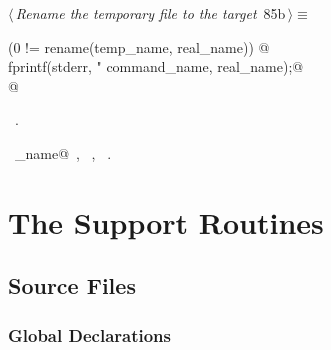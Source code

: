 \documentclass[a4paper]{report}
\begin{document}
\begin{flushleft} \small
\begin{minipage}{\linewidth}\label{scrap175}\raggedright\small
{} $\langle\,${\it Rename the temporary file to the target}\nobreak\ {\footnotesize {85b}}$\,\rangle\equiv$
\vspace{-1ex}
\begin{list}{}{} \item
\mbox{}\verb@if (0 != rename(temp_name, real_name)) {@\\
\mbox{}\verb@  fprintf(stderr, "%s: can't rename output file to %s\n",@\\
\mbox{}\verb@          command_name, real_name);@\\
\mbox{}\verb@}@\\
\mbox{}\verb@@{\NWsep}
\end{list}
\vspace{-1.5ex}
\footnotesize
\begin{list}{}{\setlength{\itemsep}{-\parsep}\setlength{\itemindent}{-\leftmargin}}
\item \NWtxtMacroRefIn\ .
\item \NWtxtIdentsUsed\nobreak\  \verb@command_name@\nobreak\ , \verb@fprintf@\nobreak\ , \verb@stderr@\nobreak\ .
\item{}
\end{list}
\end{minipage}\vspace{4ex}
\end{flushleft}
\chapter{The Support Routines}

\section{Source Files} \label{source-files}

\subsection{Global Declarations}
\end{document}
